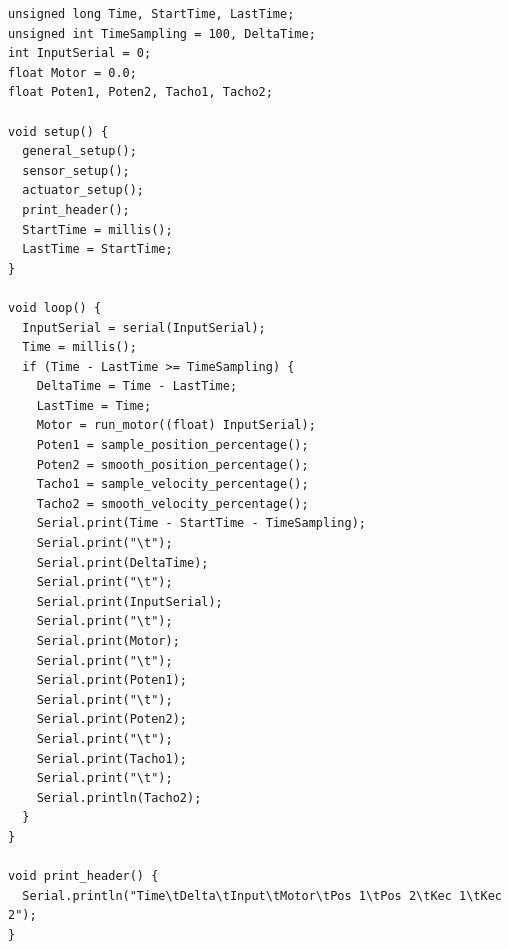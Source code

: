 \documentclass[11pt,a4paper]{article}
\begin{document}
\begin{lstlisting}[caption={Program utama \texttt{5\_main\_motor}},label={lst:main_motor}]
unsigned long Time, StartTime, LastTime;
unsigned int TimeSampling = 100, DeltaTime;
int InputSerial = 0;
float Motor = 0.0;
float Poten1, Poten2, Tacho1, Tacho2;

void setup() {
  general_setup();
  sensor_setup();
  actuator_setup();
  print_header();
  StartTime = millis();
  LastTime = StartTime;
}

void loop() {
  InputSerial = serial(InputSerial);
  Time = millis();
  if (Time - LastTime >= TimeSampling) {
    DeltaTime = Time - LastTime;
    LastTime = Time;
    Motor = run_motor((float) InputSerial);
    Poten1 = sample_position_percentage();
    Poten2 = smooth_position_percentage();
    Tacho1 = sample_velocity_percentage();
    Tacho2 = smooth_velocity_percentage();
    Serial.print(Time - StartTime - TimeSampling);
    Serial.print("\t");
    Serial.print(DeltaTime);
    Serial.print("\t");
    Serial.print(InputSerial);
    Serial.print("\t");
    Serial.print(Motor);
    Serial.print("\t");
    Serial.print(Poten1);
    Serial.print("\t");
    Serial.print(Poten2);
    Serial.print("\t");
    Serial.print(Tacho1);
    Serial.print("\t");
    Serial.println(Tacho2);
  }
}

void print_header() {
  Serial.println("Time\tDelta\tInput\tMotor\tPos 1\tPos 2\tKec 1\tKec 2");
}
\end{lstlisting}
\end{document}
